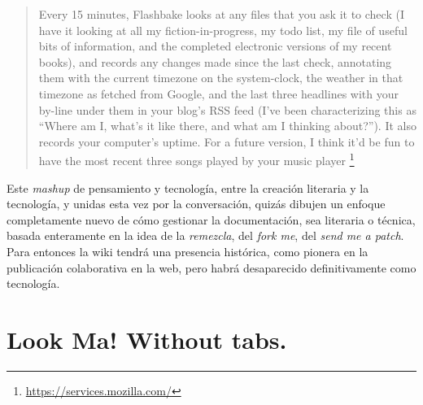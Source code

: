 \documentclass[12pt, a4paper,twoside]{book}
\newcommand{\chap}[1]{\newpage\thispagestyle{empty}\chapter{#1}\label{chap:\thechapter}}
\begin{document}
\begin{quote}
Every 15 minutes, Flashbake looks at any files that you ask it to
check (I have it looking at all my fiction-in-progress, my todo
list, my file of useful bits of information, and the completed
electronic versions of my recent books), and records any changes
made since the last check, annotating them with the current
timezone on the system-clock, the weather in that timezone as
fetched from Google, and the last three headlines with your by-line
under them in your blog's RSS feed (I've been characterizing this
as
``Where am I, what's it like there, and what am I thinking about?'').
It also records your computer's uptime. For a future version, I
think it'd be fun to have the most recent three songs played by
your music player%
\footnote{\href{https://services.mozilla.com/}{https://services.mozilla.com/}}

\end{quote}
Este \emph{mashup} de pensamiento y tecnología, entre la creación
literaria y la tecnología, y unidas esta vez por la conversación,
quizás dibujen un enfoque completamente nuevo de cómo gestionar la
documentación, sea literaria o técnica, basada enteramente en la
idea de la \emph{remezcla}, del \emph{fork me}, del
\emph{send me a patch}. Para entonces la wiki tendrá una presencia
histórica, como pionera en la publicación colaborativa en la web,
pero habrá desaparecido definitivamente como tecnología.

\chap{Look Ma! Without tabs.}
\end{document}
